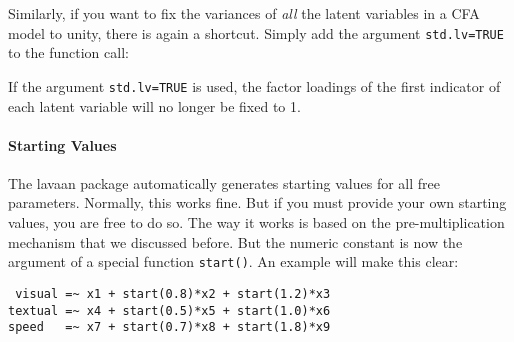 \begin{Shaded}
\begin{Highlighting}[]

\StringTok{ }
                     
                     \NormalTok{)}
\end{Highlighting}
\end{Shaded}

Similarly, if you want to fix the variances of \emph{all} the latent
variables in a CFA model to unity, there is again a shortcut. Simply add
the argument \texttt{std.lv=TRUE} to the function call:

\begin{Shaded}
\begin{Highlighting}[]
\StringTok{ }
            
            \NormalTok{)}
\end{Highlighting}
\end{Shaded}

If the argument \texttt{std.lv=TRUE} is used, the factor loadings of the
first indicator of each latent variable will no longer be fixed to 1.

\paragraph{Starting Values}

The lavaan package automatically generates starting values for all free
parameters. Normally, this works fine. But if you must provide your own
starting values, you are free to do so. The way it works is based on the
pre-multiplication mechanism that we discussed before. But the numeric
constant is now the argument of a special function \texttt{start()}. An
example will make this clear:

\begin{verbatim}
 visual =~ x1 + start(0.8)*x2 + start(1.2)*x3
textual =~ x4 + start(0.5)*x5 + start(1.0)*x6
speed   =~ x7 + start(0.7)*x8 + start(1.8)*x9
\end{verbatim}

